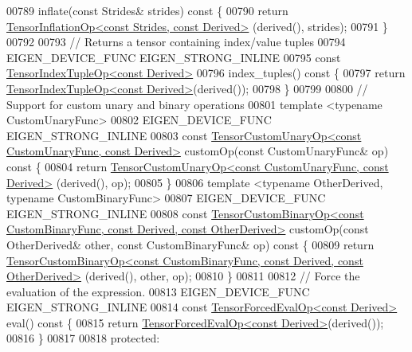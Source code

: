 \begin{DoxyCode}
00789     inflate(\textcolor{keyword}{const} Strides& strides)\textcolor{keyword}{ const }\{
00790       \textcolor{keywordflow}{return} \hyperlink{class_eigen_1_1_tensor_inflation_op}{TensorInflationOp<const Strides, const Derived>}
      (derived(), strides);
00791     \}
00792 
00793     \textcolor{comment}{// Returns a tensor containing index/value tuples}
00794     EIGEN\_DEVICE\_FUNC EIGEN\_STRONG\_INLINE
00795     \textcolor{keyword}{const} \hyperlink{class_eigen_1_1_tensor_index_tuple_op}{TensorIndexTupleOp<const Derived>}
00796     index\_tuples()\textcolor{keyword}{ const }\{
00797       \textcolor{keywordflow}{return} \hyperlink{class_eigen_1_1_tensor_index_tuple_op}{TensorIndexTupleOp<const Derived>}(derived());
00798     \}
00799 
00800     \textcolor{comment}{// Support for custom unary and binary operations}
00801     \textcolor{keyword}{template} <\textcolor{keyword}{typename} CustomUnaryFunc>
00802     EIGEN\_DEVICE\_FUNC EIGEN\_STRONG\_INLINE
00803     \textcolor{keyword}{const} \hyperlink{class_eigen_1_1_tensor_custom_unary_op}{TensorCustomUnaryOp<const CustomUnaryFunc, const Derived>}
       customOp(\textcolor{keyword}{const} CustomUnaryFunc& op)\textcolor{keyword}{ const }\{
00804       \textcolor{keywordflow}{return} \hyperlink{class_eigen_1_1_tensor_custom_unary_op}{TensorCustomUnaryOp<const CustomUnaryFunc, const Derived>}
      (derived(), op);
00805     \}
00806     \textcolor{keyword}{template} <\textcolor{keyword}{typename} OtherDerived, \textcolor{keyword}{typename} CustomBinaryFunc>
00807     EIGEN\_DEVICE\_FUNC EIGEN\_STRONG\_INLINE
00808     \textcolor{keyword}{const} 
      \hyperlink{class_eigen_1_1_tensor_custom_binary_op}{TensorCustomBinaryOp<const CustomBinaryFunc, const Derived, const OtherDerived>}
       customOp(\textcolor{keyword}{const} OtherDerived& other, \textcolor{keyword}{const} CustomBinaryFunc& op)\textcolor{keyword}{ const }\{
00809       \textcolor{keywordflow}{return} 
      \hyperlink{class_eigen_1_1_tensor_custom_binary_op}{TensorCustomBinaryOp<const CustomBinaryFunc, const Derived, const OtherDerived>}
      (derived(), other, op);
00810     \}
00811 
00812     \textcolor{comment}{// Force the evaluation of the expression.}
00813     EIGEN\_DEVICE\_FUNC EIGEN\_STRONG\_INLINE
00814     \textcolor{keyword}{const} \hyperlink{class_eigen_1_1_tensor_forced_eval_op}{TensorForcedEvalOp<const Derived>} eval()\textcolor{keyword}{ const }\{
00815       \textcolor{keywordflow}{return} \hyperlink{class_eigen_1_1_tensor_forced_eval_op}{TensorForcedEvalOp<const Derived>}(derived());
00816     \}
00817 
00818   \textcolor{keyword}{protected}:

\end{DoxyCode}
